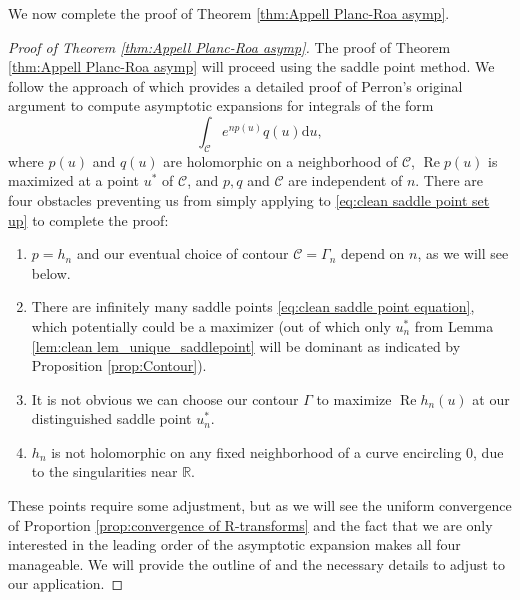 \documentclass[reqno]{amsart}
\newcommand{\1}{\mathbf{1}}
\newcommand{\dd}{\mathrm{d}}
\renewcommand\Re{\operatorname{Re}}
\newcommand{\R}{\mathbb{R}}
\def\R{\mathbb{R}}
\theoremstyle{plain}
\theoremstyle{definition}
\theoremstyle{remark}
\numberwithin{equation}{section}
\begin{document}
	We now complete the proof of Theorem \ref{thm:Appell Planc-Roa asymp}.
	\begin{proof}[Proof of Theorem \ref{thm:Appell Planc-Roa asymp}]
	The proof of Theorem \ref{thm:Appell Planc-Roa asymp} will proceed using the saddle point method. We follow the approach of \cite{OSullivan2019} which provides a detailed proof of Perron's \cite{Perron17} original argument to compute asymptotic expansions for integrals of the form \begin{equation}
		\int_{\mathcal{C}} e^{np(u)}q(u)\dd u,
	\end{equation}  where $p(u)$ and $q(u)$ are holomorphic on a neighborhood of $\mathcal{C}$, $\Re p(u)$ is maximized at a point $u^*$ of $\mathcal{C}$, and $p,q$ and $\mathcal{C}$ are independent of $n$. There are four obstacles preventing us from simply applying \cite[Corollary 1.4]{OSullivan2019} to \eqref{eq:clean saddle point set up} to complete the proof:
	 \begin{enumerate}
	\item $p=h_n$ and our eventual choice of contour $\mathcal C=\Gamma_n$ depend on $n$, as we will see below.
	\item There are infinitely many saddle points \eqref{eq:clean saddle point equation}, which potentially could be a maximizer (out of which only $u_n^*$ from Lemma \ref{lem:clean lem_unique_saddlepoint} will be dominant as indicated by Proposition \ref{prop:Contour}).
	\item  It is not obvious we can choose our contour $\Gamma$ to maximize $\Re h_n(u)$ at our distinguished saddle point $u_n^*$.
	\item $h_n$ is not holomorphic on any fixed neighborhood of a curve encircling $0$, due to the singularities near $\R$.
	\end{enumerate}
	 These points require some adjustment, but as we will see the uniform convergence of Proportion \ref{prop:convergence of R-transforms} and the fact that we are only interested in the leading order of the asymptotic expansion makes all four manageable. We will provide the outline of \cite{OSullivan2019} and the necessary details to adjust to our application.
	 

\end{proof}
\end{document}
